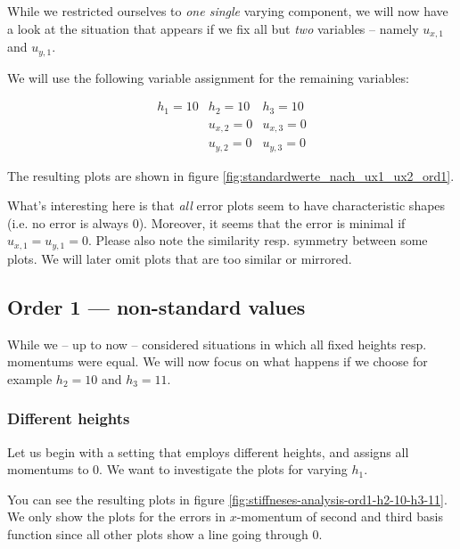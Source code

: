 \documentclass{article}
\begin{document}
While we restricted ourselves to \emph{one single} varying component, we will now have a look at the situation that appears if we fix all but \emph{two} variables -- namely $u_{x,1}$ and $u_{y,1}$.

We will use the following variable assignment for the remaining variables:

\begin{eqnarray*}
  h_1 = 10 & h_2 = 10 & h_3 = 10 \\
   & u_{x,2} = 0 & u_{x,3} = 0 \\
   & u_{y,2} = 0 & u_{y,3} = 0
\end{eqnarray*}

The resulting plots are shown in figure \ref{fig:standardwerte_nach_ux1_ux2_ord1}.



What's interesting here is that \emph{all} error plots seem to have characteristic shapes (i.e. no error is always 0). Moreover, it seems that the error is minimal if $u_{x,1}=u_{y,1}=0$. Please also note the similarity resp. symmetry between some plots. We will later omit plots that are too similar or mirrored.

\clearpage{} %

\subsection{Order 1 --- non-standard values}
\label{sec:stiffness-analysis-ord1-non-std-values}

While we -- up to now -- considered situations in which all fixed heights resp. momentums were equal. We will now focus on what happens if we choose for example $h_2=10$ and $h_3=11$.

\subsubsection{Different heights}
\label{sec:stiffness-analysis-ord1-differing-h2-10-h3-11}

Let us begin with a setting that employs different heights, and assigns all momentums to 0. We want to investigate the plots for varying $h_1$.



You can see the resulting plots in figure \ref{fig:stiffneses-analysis-ord1-h2-10-h3-11}. We only show the plots for the errors in $x$-momentum of second and third basis function since all other plots show a line going through 0.
\end{document}

